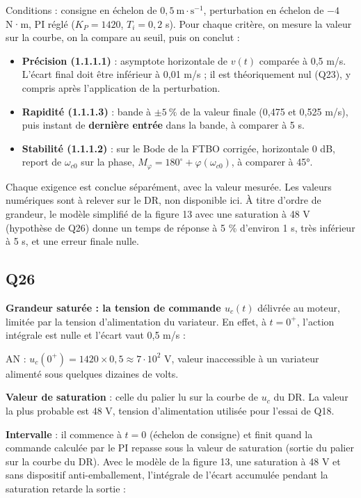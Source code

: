\documentclass[11pt,a4paper]{article}
\providecommand{\tightlist}{\setlength{\itemsep}{0pt}\setlength{\parskip}{0pt}}
\newcommand{\equationajustee}[1]{%
  \sbox{\boiteequation}{$\displaystyle #1$}%
  \ifdim\wd\boiteequation>\linewidth
    \[\resizebox{\linewidth}{!}{\usebox{\boiteequation}}\]%
  \else
    \[#1\]%
  \fi}
\begin{document}
Conditions : consigne en échelon de \(0{,}5\ \mathrm{m\cdot s^{-1}}\), perturbation en échelon de \(-4\) N·m, PI réglé (\(K_P=1420\), \(T_i=0{,}2\) s). Pour chaque critère, on mesure la valeur sur la courbe, on la compare au seuil, puis on conclut :

\begin{itemize}
\tightlist
\item
  \textbf{Précision (1.1.1.1)} : asymptote horizontale de \(v(t)\) comparée à 0,5 m/s. L'écart final doit être inférieur à 0,01 m/s ; il est théoriquement nul (Q23), y compris après l'application de la perturbation.
\item
  \textbf{Rapidité (1.1.1.3)} : bande à \(\pm5\ \%\) de la valeur finale (0,475 et 0,525 m/s), puis instant de \textbf{dernière entrée} dans la bande, à comparer à 5 s.
\item
  \textbf{Stabilité (1.1.1.2)} : sur le Bode de la FTBO corrigée, horizontale 0 dB, report de \(\omega_{c0}\) sur la phase, \(M_\varphi=180^\circ+\varphi(\omega_{c0})\), à comparer à 45°.
\end{itemize}

Chaque exigence est conclue séparément, avec la valeur mesurée. Les valeurs numériques sont à relever sur le DR, non disponible ici. À titre d'ordre de grandeur, le modèle simplifié de la figure 13 avec une saturation à 48 V (hypothèse de Q26) donne un temps de réponse à 5 \% d'environ 1 s, très inférieur à 5 s, et une erreur finale nulle.

\hypertarget{q26}{%
\subsection{Q26}\label{q26}}

\textbf{Grandeur saturée : la tension de commande \(u_c(t)\)} délivrée au moteur, limitée par la tension d'alimentation du variateur. En effet, à \(t=0^+\), l'action intégrale est nulle et l'écart vaut 0,5 m/s :

\equationajustee{u_c(0^+)=K_P\,\varepsilon'(0^+)}

AN : \(u_c(0^+)=1420\times0{,}5\approx7\cdot10^2\) V, valeur inaccessible à un variateur alimenté sous quelques dizaines de volts.

\textbf{Valeur de saturation} : celle du palier lu sur la courbe de \(u_c\) du DR. La valeur la plus probable est 48 V, tension d'alimentation utilisée pour l'essai de Q18.

\textbf{Intervalle} : il commence à \(t=0\) (échelon de consigne) et finit quand la commande calculée par le PI repasse sous la valeur de saturation (sortie du palier sur la courbe du DR). Avec le modèle de la figure 13, une saturation à 48 V et sans dispositif anti-emballement, l'intégrale de l'écart accumulée pendant la saturation retarde la sortie :
\end{document}
